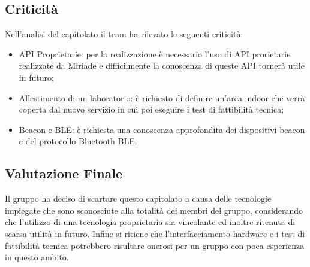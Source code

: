   
\subsection{Criticità}
Nell'analisi del capitolato il team ha rilevato le seguenti criticità:
\begin{itemize} 
\item API Proprietarie: per la realizzazione è necessario l'uso di API prorietarie realizzate da Miriade e difficilmente la conoscenza di queste API tornerà utile in futuro;
\item Allestimento di un laboratorio: è richiesto di definire un'area indoor che verrà coperta dal nuovo servizio in cui poi eseguire i test di fattibilità tecnica;
\item Beacon e BLE: è richiesta una conoscenza approfondita dei dispositivi beacon e del protocollo Bluetooth BLE.
\end{itemize}


\subsection{Valutazione Finale}
Il gruppo ha deciso di scartare questo capitolato a causa delle tecnologie impiegate che sono sconosciute alla totalità dei membri del gruppo, considerando che l'utilizzo di una tecnologia proprietaria sia vincolante ed inoltre ritenuta di scarsa utilità in futuro. Infine si ritiene che l'interfacciamento hardware e i test di fattibilità tecnica potrebbero risultare onerosi per un gruppo con poca esperienza in questo ambito.  
